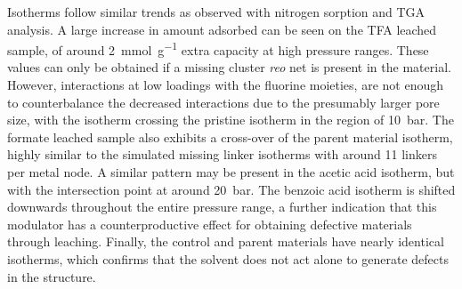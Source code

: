 Isotherms follow similar trends as observed with nitrogen sorption and
\gls{TGA} analysis. A large increase in amount adsorbed can be
seen on the \gls{TFA} leached sample, of around \SI{2}{\milli\mol\per\gram}
extra capacity at high pressure ranges. These values can only be obtained 
if a missing cluster \textit{reo} net is present in the 
material. However, interactions at low loadings with the fluorine moieties,
are not enough to counterbalance the decreased interactions due to the 
presumably larger pore size, with the isotherm crossing the pristine 
isotherm in the region of \SI{10}{\bar}.
The formate leached sample also exhibits a cross-over of the parent 
material isotherm, highly similar to the simulated missing linker isotherms 
with around 11 linkers per metal node. A similar pattern may be 
present in the acetic acid isotherm, but with the intersection point
at around \SI{20}{\bar}. The benzoic acid isotherm
is shifted downwards throughout the entire pressure range, a further
indication that this modulator has a counterproductive effect for
obtaining defective materials through leaching.
Finally, the control and parent materials have nearly identical isotherms,
which confirms that the solvent does not act alone to generate 
defects in the structure.
